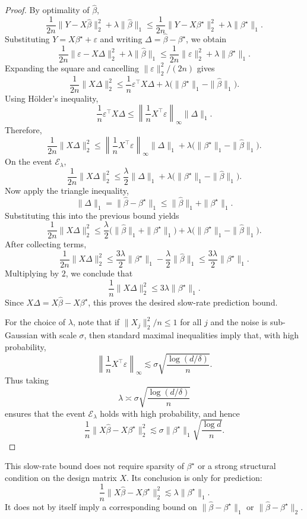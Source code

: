 \begin{proof}
By optimality of \(\hat\beta\),
\[
\frac{1}{2n}\|Y-X\hat\beta\|_2^2+\lambda\|\hat\beta\|_1
\le
\frac{1}{2n}\|Y-X\beta^\star\|_2^2+\lambda\|\beta^\star\|_1.
\]
Substituting \(Y=X\beta^\star+\varepsilon\) and writing \(\Delta=\hat\beta-\beta^\star\), we obtain
\[
\frac{1}{2n}\|\varepsilon-X\Delta\|_2^2+\lambda\|\hat\beta\|_1
\le
\frac{1}{2n}\|\varepsilon\|_2^2+\lambda\|\beta^\star\|_1.
\]
Expanding the square and cancelling \(\|\varepsilon\|_2^2/(2n)\) gives
\[
\frac{1}{2n}\|X\Delta\|_2^2
\le
\frac{1}{n}\varepsilon^\top X\Delta
+\lambda\bigl(\|\beta^\star\|_1-\|\hat\beta\|_1\bigr).
\]
Using Hölder's inequality,
\[
\frac{1}{n}\varepsilon^\top X\Delta
\le
\left\|\frac{1}{n}X^\top\varepsilon\right\|_\infty \|\Delta\|_1.
\]
Therefore,
\[
\frac{1}{2n}\|X\Delta\|_2^2
\le
\left\|\frac{1}{n}X^\top\varepsilon\right\|_\infty \|\Delta\|_1
+\lambda\bigl(\|\beta^\star\|_1-\|\hat\beta\|_1\bigr).
\]
On the event \(\mathcal E_\lambda\),
\[
\frac{1}{2n}\|X\Delta\|_2^2
\le
\frac{\lambda}{2}\|\Delta\|_1
+\lambda\bigl(\|\beta^\star\|_1-\|\hat\beta\|_1\bigr).
\]
Now apply the triangle inequality,
\[
\|\Delta\|_1=\|\hat\beta-\beta^\star\|_1\le \|\hat\beta\|_1+\|\beta^\star\|_1.
\]
Substituting this into the previous bound yields
\[
\frac{1}{2n}\|X\Delta\|_2^2
\le
\frac{\lambda}{2}\bigl(\|\hat\beta\|_1+\|\beta^\star\|_1\bigr)
+\lambda\bigl(\|\beta^\star\|_1-\|\hat\beta\|_1\bigr).
\]
After collecting terms,
\[
\frac{1}{2n}\|X\Delta\|_2^2
\le
\frac{3\lambda}{2}\|\beta^\star\|_1-\frac{\lambda}{2}\|\hat\beta\|_1
\le
\frac{3\lambda}{2}\|\beta^\star\|_1.
\]
Multiplying by \(2\), we conclude that
\[
\frac{1}{n}\|X\Delta\|_2^2
\le
3\lambda\|\beta^\star\|_1.
\]
Since \(X\Delta=X\hat\beta-X\beta^\star\), this proves the desired slow-rate prediction bound.

For the choice of \(\lambda\), note that if \(\|X_j\|_2^2/n\le 1\) for all \(j\) and the noise is sub-Gaussian with scale \(\sigma\), then standard maximal inequalities imply that, with high probability,
\[
\left\|\frac{1}{n}X^\top\varepsilon\right\|_\infty
\lesssim
\sigma\sqrt{\frac{\log(d/\delta)}{n}}.
\]
Thus taking
\[
\lambda \asymp \sigma \sqrt{\frac{\log(d/\delta)}{n}}
\]
ensures that the event \(\mathcal E_\lambda\) holds with high probability, and hence
\[
\frac{1}{n}\|X\hat\beta-X\beta^\star\|_2^2
\lesssim
\sigma\|\beta^\star\|_1\sqrt{\frac{\log d}{n}}.
\]
\end{proof}

\begin{remark}
This slow-rate bound does not require sparsity of \(\beta^\star\) or a strong structural condition on the design matrix \(X\). Its conclusion is only for prediction:
\[
\frac{1}{n}\|X\hat\beta-X\beta^\star\|_2^2
\lesssim
\lambda\|\beta^\star\|_1.
\]
It does not by itself imply a corresponding bound on \(\|\hat\beta-\beta^\star\|_1\) or \(\|\hat\beta-\beta^\star\|_2\).
\end{remark}

